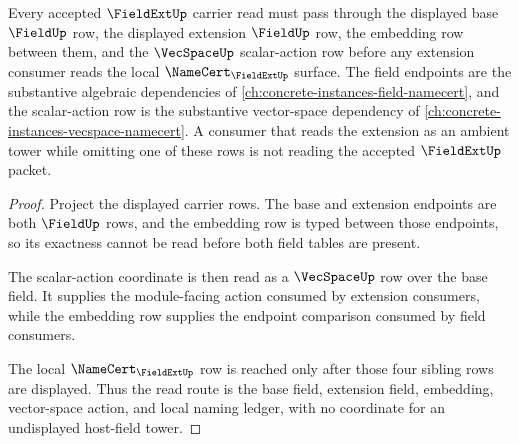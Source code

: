 \begin{theorem}
\label{thm:fieldext-field-vecspace-sibling-dependency}
Every accepted $\FieldExtUp$ carrier read must pass through the displayed base $\FieldUp$ row, the displayed extension $\FieldUp$ row, the embedding row between them, and the $\VecSpaceUp$ scalar-action row before any extension consumer reads the local $\NameCert_{\FieldExtUp}$ surface. The field endpoints are the substantive algebraic dependencies of \autoref{ch:concrete-instances-field-namecert}, and the scalar-action row is the substantive vector-space dependency of \autoref{ch:concrete-instances-vecspace-namecert}. A consumer that reads the extension as an ambient tower while omitting one of these rows is not reading the accepted $\FieldExtUp$ packet.
\end{theorem}
\begin{proof}
Project the displayed carrier rows. The base and extension endpoints are both $\FieldUp$ rows, and the embedding row is typed between those endpoints, so its exactness cannot be read before both field tables are present.

The scalar-action coordinate is then read as a $\VecSpaceUp$ row over the base field. It supplies the module-facing action consumed by extension consumers, while the embedding row supplies the endpoint comparison consumed by field consumers.

The local $\NameCert_{\FieldExtUp}$ row is reached only after those four sibling rows are displayed. Thus the read route is the base field, extension field, embedding, vector-space action, and local naming ledger, with no coordinate for an undisplayed host-field tower.
\end{proof}
